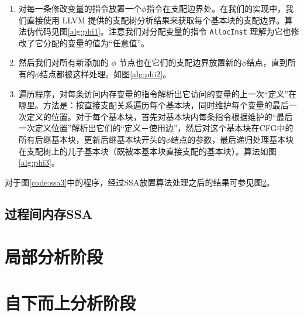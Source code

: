 \begin{enumerate}[topsep=1em, itemsep=1em]
\item 对每一条修改变量的指令放置一个$\phi$指令在支配边界处。在我们的实现中，我们直接使用 LLVM 提供的支配树分析结果来获取每个基本块的支配边界。算法伪代码见图\ref{alg:phi1}。注意我们对分配变量的指令 \verb|AllocInst| 理解为它也修改了它分配的变量的值为“任意值”。
\item 然后我们对所有新添加的 $\phi$ 节点也在它们的支配边界放置新的$\phi$结点，直到所有的$\phi$结点都被这样处理。如图\ref{alg:phi2}。
\item 遍历程序，对每条访问内存变量的指令解析出它访问的变量的上一次“定义”在哪里。方法是：按直接支配关系遍历每个基本块，同时维护每个变量的最后一次定义的位置。对于每个基本块，首先对基本块内每条指令根据维护的“最后一次定义位置”解析出它们的“定义－使用边”，然后对这个基本块在CFG中的所有后继基本块，更新后继基本块开头的$\phi$结点的参数，最后递归处理基本块在支配树上的儿子基本块（既被本基本块直接支配的基本块）。算法如图\ref{alg:phi3}。
\end{enumerate}

对于图\ref{code:ssa3}中的程序，经过SSA放置算法处理之后的结果可参见图\ref{}。

\subsection{过程间内存SSA}

\section{局部分析阶段}

\section{自下而上分析阶段}
